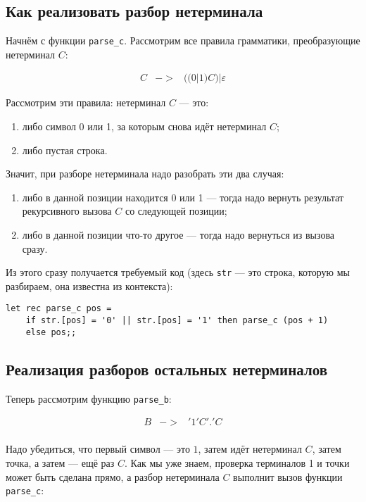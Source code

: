 \documentclass[12pt]{article}
\begin{document}
\subsection{Как реализовать разбор нетерминала}

Начнём с функции \verb!parse_c!. Рассмотрим все правила грамматики, преобразующие
нетерминал $C$:

\begin{bnf}\begin{eqnarray*}
C &->& ((0 | 1) C) | \varepsilon
\end{eqnarray*}\end{bnf}

Рассмотрим эти правила: нетерминал $C$ --- это:
\begin{enumerate}
\item либо символ 0 или 1, за которым снова идёт нетерминал $C$;
\item либо пустая строка.
\end{enumerate}
Значит, при разборе нетерминала надо разобрать эти два случая:
\begin{enumerate}
\item либо в данной позиции находится 0 или 1 --- тогда надо вернуть результат 
рекурсивного вызова $C$ со следующей позиции;
\item либо в данной позиции что-то другое --- тогда надо вернуться из вызова сразу.
\end{enumerate}

Из этого сразу получается требуемый код (здесь \verb!str! --- это строка,
которую мы разбираем, она известна из контекста):

\begin{verbatim}
let rec parse_c pos =
    if str.[pos] = '0' || str.[pos] = '1' then parse_c (pos + 1)
    else pos;;
\end{verbatim}

\subsection{Реализация разборов остальных нетерминалов}

Теперь рассмотрим функцию \verb!parse_b!: 
\begin{bnf}\begin{eqnarray*}
B &->& '1' C '.' C\\
\end{eqnarray*}\end{bnf}

Надо убедиться, что первый символ --- это $1$, затем идёт нетерминал $C$, затем точка, 
а затем --- ещё раз $C$. Как мы уже знаем, проверка терминалов 1 и точки может быть
сделана прямо, а разбор нетерминала $C$ выполнит вызов функции \verb!parse_c!:
\end{document}
